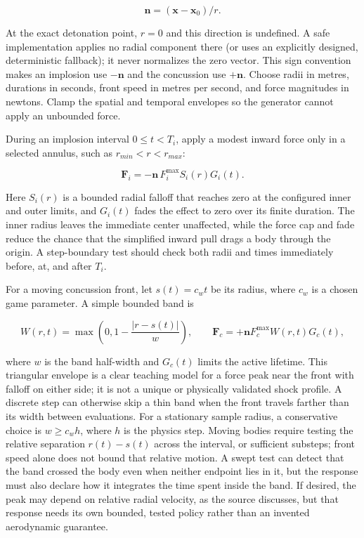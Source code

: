 \[
\mathbf{n}=(\mathbf{x}-\mathbf{x}_0)/r.
\]

At the exact detonation point, \(r=0\) and this direction is undefined. A safe implementation applies no radial component there (or uses an explicitly designed, deterministic fallback); it never normalizes the zero vector. This sign convention makes an implosion use \(-\mathbf n\) and the concussion use \(+\mathbf n\). Choose radii in metres, durations in seconds, front speed in metres per second, and force magnitudes in newtons. Clamp the spatial and temporal envelopes so the generator cannot apply an unbounded force.

During an implosion interval \(0\leq  t<T_i\), apply a modest inward force only in a selected annulus, such as \(r_{min}<r<r_{max}\):

\[
\mathbf F_i=-\mathbf n\,F_i^{\max}S_i(r)G_i(t).
\]

Here \(S_i(r)\) is a bounded radial falloff that reaches zero at the configured inner and outer limits, and \(G_i(t)\) fades the effect to zero over its finite duration. The inner radius leaves the immediate center unaffected, while the force cap and fade reduce the chance that the simplified inward pull drags a body through the origin. A step-boundary test should check both radii and times immediately before, at, and after \(T_i\).

For a moving concussion front, let \(s(t)=c_wt\) be its radius, where \(c_w\) is a chosen game parameter. A simple bounded band is

\[
W(r,t)=\max\left(0,1-\frac{|r-s(t)|}{w}\right),\qquad
\mathbf F_c=+\mathbf n F_c^{\max}W(r,t)G_c(t),
\]

where \(w\) is the band half-width and \(G_c(t)\) limits the active lifetime. This triangular envelope is a clear teaching model for a force peak near the front with falloff on either side; it is not a unique or physically validated shock profile. A discrete step can otherwise skip a thin band when the front travels farther than its width between evaluations. For a stationary sample radius, a conservative choice is \(w\geq c_w h\), where \(h\) is the physics step. Moving bodies require testing the relative separation \(r(t)-s(t)\) across the interval, or sufficient substeps; front speed alone does not bound that relative motion. A swept test can detect that the band crossed the body even when neither endpoint lies in it, but the response must also declare how it integrates the time spent inside the band. If desired, the peak may depend on relative radial velocity, as the source discusses, but that response needs its own bounded, tested policy rather than an invented aerodynamic guarantee.

